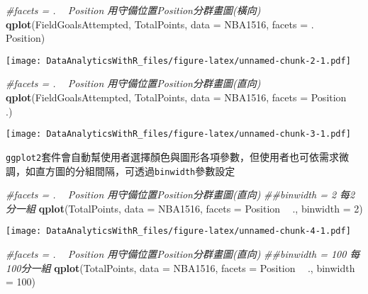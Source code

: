 \documentclass[
]{book}
\newenvironment{Shaded}{\begin{snugshade}}{\end{snugshade}}
\newcommand{\CommentTok}[1]{\textcolor[rgb]{0.56,0.35,0.01}{\textit{#1}}}
\newcommand{\DataTypeTok}[1]{\textcolor[rgb]{0.13,0.29,0.53}{#1}}
\newcommand{\DecValTok}[1]{\textcolor[rgb]{0.00,0.00,0.81}{#1}}
\newcommand{\KeywordTok}[1]{\textcolor[rgb]{0.13,0.29,0.53}{\textbf{#1}}}
\newcommand{\NormalTok}[1]{#1}
\newcommand{\OperatorTok}[1]{\textcolor[rgb]{0.81,0.36,0.00}{\textbf{#1}}}
\newcommand{\StringTok}[1]{\textcolor[rgb]{0.31,0.60,0.02}{#1}}
\begin{document}
\begin{Shaded}
\begin{Highlighting}[]
\CommentTok{#facets = . ~ Position 用守備位置Position分群畫圖(橫向)}
\KeywordTok{qplot}\NormalTok{(FieldGoalsAttempted, TotalPoints, }
      \DataTypeTok{data =}\NormalTok{ NBA1516,}
      \DataTypeTok{facets =}\NormalTok{ . }\OperatorTok{~}\StringTok{ }\NormalTok{Position)}
\end{Highlighting}
\end{Shaded}

\texttt{[image: DataAnalyticsWithR\_files/figure-latex/unnamed-chunk-2-1.pdf]}

\begin{Shaded}
\begin{Highlighting}[]
\CommentTok{#facets = . ~ Position 用守備位置Position分群畫圖(直向)}
\KeywordTok{qplot}\NormalTok{(FieldGoalsAttempted, TotalPoints, }
      \DataTypeTok{data =}\NormalTok{ NBA1516,}
      \DataTypeTok{facets =}\NormalTok{ Position }\OperatorTok{~}\StringTok{ }\NormalTok{.)}
\end{Highlighting}
\end{Shaded}

\texttt{[image: DataAnalyticsWithR\_files/figure-latex/unnamed-chunk-3-1.pdf]}

\texttt{ggplot2}套件會自動幫使用者選擇顏色與圖形各項參數，但使用者也可依需求微調，如直方圖的分組間隔，可透過\texttt{binwidth}參數設定

\begin{Shaded}
\begin{Highlighting}[]
\CommentTok{#facets = . ~ Position 用守備位置Position分群畫圖(直向)}
\CommentTok{##binwidth = 2 每2分一組}
\KeywordTok{qplot}\NormalTok{(TotalPoints, }\DataTypeTok{data =}\NormalTok{ NBA1516, }
      \DataTypeTok{facets =}\NormalTok{ Position }\OperatorTok{~}\StringTok{ }\NormalTok{., }\DataTypeTok{binwidth =} \DecValTok{2}\NormalTok{)}
\end{Highlighting}
\end{Shaded}

\texttt{[image: DataAnalyticsWithR\_files/figure-latex/unnamed-chunk-4-1.pdf]}

\begin{Shaded}
\begin{Highlighting}[]
\CommentTok{#facets = . ~ Position 用守備位置Position分群畫圖(直向)}
\CommentTok{##binwidth = 100 每100分一組}
\KeywordTok{qplot}\NormalTok{(TotalPoints, }\DataTypeTok{data =}\NormalTok{ NBA1516,}
      \DataTypeTok{facets =}\NormalTok{ Position }\OperatorTok{~}\StringTok{ }\NormalTok{., }\DataTypeTok{binwidth =} \DecValTok{100}\NormalTok{)}
\end{Highlighting}
\end{Shaded}
\end{document}
